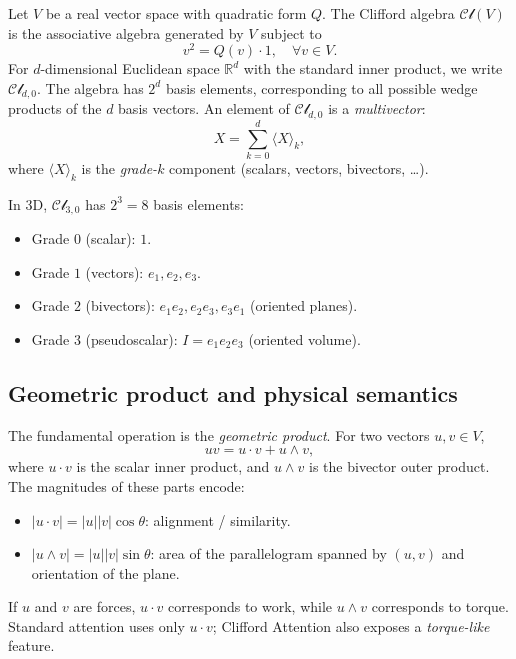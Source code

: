\documentclass{article}
\theoremstyle{plain}
\theoremstyle{definition}
\theoremstyle{remark}
\newcommand{\cliff}{\mathcal{Cl}}
\newcommand{\R}{\mathbb{R}}
\newcommand{\grade}[2]{\langle #1 \rangle_{#2}}
\begin{document}
Let $V$ be a real vector space with quadratic form $Q$. The Clifford algebra $\cliff(V)$ is the associative algebra generated by $V$ subject to
\begin{equation}
    v^2 = Q(v) \cdot 1, \quad \forall v \in V.
\end{equation}
For $d$-dimensional Euclidean space $\R^d$ with the standard inner product, we write $\cliff_{d,0}$. The algebra has $2^d$ basis elements, corresponding to all possible wedge products of the $d$ basis vectors. An element of $\cliff_{d,0}$ is a \emph{multivector}:
\begin{equation}
    X = \sum_{k=0}^d \grade{X}{k},
\end{equation}
where $\grade{X}{k}$ is the \emph{grade-$k$} component (scalars, vectors, bivectors, \dots).

In 3D, $\cliff_{3,0}$ has $2^3 = 8$ basis elements:
\begin{itemize}
    \item Grade $0$ (scalar): $1$.
    \item Grade $1$ (vectors): $e_1, e_2, e_3$.
    \item Grade $2$ (bivectors): $e_1 e_2, e_2 e_3, e_3 e_1$ (oriented planes).
    \item Grade $3$ (pseudoscalar): $I = e_1 e_2 e_3$ (oriented volume).
\end{itemize}

\subsection{Geometric product and physical semantics}

The fundamental operation is the \emph{geometric product}. For two vectors $u,v \in V$,
\begin{equation}
    uv = u \cdot v + u \wedge v,
\end{equation}
where $u \cdot v$ is the scalar inner product, and $u \wedge v$ is the bivector outer product. The magnitudes of these parts encode:
\begin{itemize}
    \item $|u \cdot v| = |u||v|\cos\theta$: alignment / similarity.
    \item $|u \wedge v| = |u||v|\sin\theta$: area of the parallelogram spanned by $(u,v)$ and orientation of the plane.
\end{itemize}
If $u$ and $v$ are forces, $u \cdot v$ corresponds to work, while $u \wedge v$ corresponds to torque. Standard attention uses only $u \cdot v$; Clifford Attention also exposes a \emph{torque-like} feature.
\end{document}
